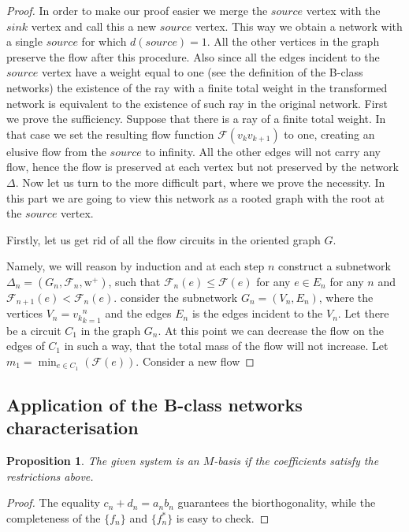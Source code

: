 \documentclass[12pt]{article}
\renewcommand{\leq}{\leqslant}
\newtheorem{prop}{Proposition}
\theoremstyle{definition}
\newcommand{\wtpos}{\mathrm{w}^+}
\newcommand{\flow}{\mathcal{F}}
\newcommand{\source}{\mathit{source}}
\newcommand{\sink}{\mathit{sink}}
\newcommand{\net}{\Delta}
\numberwithin{remark}{section}
\numberwithin{theorem}{section}
\numberwithin{prop}{section}
\numberwithin{equation}{section}
\numberwithin{lemma}{section}
\numberwithin{prop_under_lemma}{lemma}
\begin{document}
    \begin{proof}
      In order to make our proof easier we merge the $\source$ vertex with the $\sink$ vertex and call this a
      new $\source$ vertex.
      This way we obtain a network with a single $\source$ for which $d(\source) = 1$.
      All the other vertices in the graph preserve the flow after this procedure.
      Also since all the edges incident to the $\source$ vertex have a weight equal to one
      (see the definition of the B-class networks) the existence of the ray with a finite total weight
      in the transformed network is equivalent to the existence of such ray in the original network.
      First we prove the sufficiency.
      Suppose that there is a ray of a finite total weight. 
      In that case we set the resulting flow function $\flow(v_k v_{k+1})$ to one, creating an elusive flow
      from the $\source$ to infinity. All the other edges will not carry any flow, hence the flow is preserved
      at each vertex but not preserved by the network $\net$.
      Now let us turn to the more difficult part, where we prove the necessity.
      In this part we are going to view this network as a rooted graph with the root at the $\source$ vertex.

      Firstly, let us get rid of all the flow circuits in the oriented graph $G$.

      Namely, we will reason by induction and at each step $n$ construct a subnetwork
      $\net_n = (G_n, \flow_n, \wtpos)$, such that $\flow_n(e) \leq \flow(e)$ for any $e \in E_n$ for any $n$
      and $\flow_{n+1}(e) < \flow_n(e)$.
      consider the subnetwork $G_n = (V_n, E_n)$, where the vertices
      $V_n = {v_k}_{k=1}^n$ and the edges $E_n$ is the edges incident to the $V_n$.
      Let there be a circuit $C_1$ in the graph $G_n$.
      At this point we can decrease the flow on the edges of $C_1$ in such a way, that the total mass
      of the flow will not increase.
      Let $m_1 = \min_{e \in C_1}(\flow(e))$.
      Consider a new flow

    \end{proof}
    \subsection{Application of the B-class networks characterisation}
    \pagebreak
    \begin{prop}
        The given system is an $M$-basis if the coefficients satisfy the restrictions above.
    \end{prop}
    \begin{proof}
        The equality $c_n + d_n = a_n b_n$ guarantees the bi\-orthogonality,
        while the completeness of the $\{f_n\}$ and $\{f_n^*\}$ is
        easy to check.
    \end{proof}
    
\end{document}
